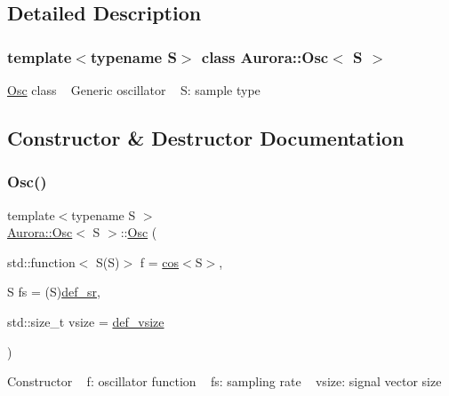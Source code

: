 \subsection{Detailed Description}
\subsubsection*{template$<$typename S$>$\newline
class Aurora\+::\+Osc$<$ S $>$}

\hyperlink{class_aurora_1_1_osc}{Osc} class ~\newline
Generic oscillator ~\newline
S\+: sample type 

\subsection{Constructor \& Destructor Documentation}
\mbox{\label{class_aurora_1_1_osc_ac97decabac1a41e2556039548f8feab4}} 
\subsubsection{\texorpdfstring{Osc()}{Osc()}}
{\footnotesize\ttfamily template$<$typename S $>$ \\
\hyperlink{class_aurora_1_1_osc}{Aurora\+::\+Osc}$<$ S $>$\+::\hyperlink{class_aurora_1_1_osc}{Osc} (\begin{DoxyParamCaption}\item[{std\+::function$<$ S(S)$>$}]{f = {\ttfamily \hyperlink{namespace_aurora_ab6ef1b966b8f27d107fcabe1027a677a}{cos}$<$S$>$},  }\item[{S}]{fs = {\ttfamily (S)\hyperlink{namespace_aurora_ad49263d809bea98dd422e95bc91bc03e}{def\+\_\+sr}},  }\item[{std\+::size\+\_\+t}]{vsize = {\ttfamily \hyperlink{namespace_aurora_afaaddf667a06e7ce23c667a8b7295263}{def\+\_\+vsize}} }\end{DoxyParamCaption})\hspace{0.3cm}{\ttfamily [inline]}}

Constructor ~\newline
f\+: oscillator function ~\newline
fs\+: sampling rate ~\newline
vsize\+: signal vector size \mbox{\label{class_aurora_1_1_osc_a95062ac1670f5de00a27c33bfb4eb117}} 
